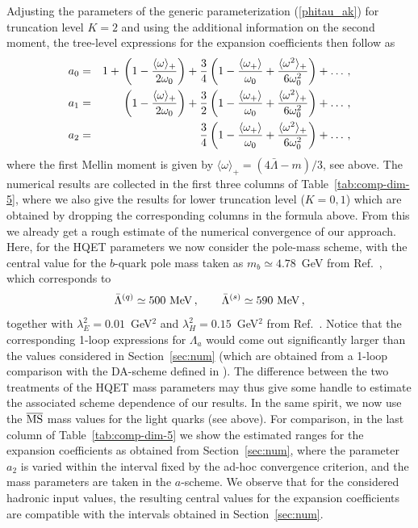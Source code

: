 \documentclass[a4paper,11pt]{article}
\begin{document}
Adjusting the parameters of the generic parameterization (\ref{phitau_ak}) for truncation level $K=2$ and using the additional information on the second moment, 
the tree-level expressions for the expansion coefficients then follow as
\begin{eqnarray}
	a_0 &=&  1  + {}\left(1- \frac{\langle \omega \rangle_+}{2\omega_0}\right) 
     + {} \frac34 \left( 1 -\frac{\langle \omega_+\rangle}{\omega_0}
     + \frac{\langle \omega^2\rangle_+}{6\omega_0^2} \right) + \ldots  \,, \cr 
	a_1 &=&  \phantom{1  + {}}  \left(1- \frac{\langle \omega\rangle_+}{2\omega_0}\right) + \frac32 \left( 1 -\frac{\langle \omega_+\rangle}{\omega_0}
     + {} \frac{\langle \omega^2\rangle_+}{6\omega_0^2} \right) + \ldots \,, \cr 
    a_2 &=& \phantom{1  + {}\left(1- \frac{\langle \omega\rangle_+}{2\omega_0}\right) + {}} 
     {} \frac34 \left( 1 -\frac{\langle \omega_+\rangle}{\omega_0}
     + {} \frac{\langle \omega^2\rangle_+}{6\omega_0^2} \right) + \ldots \,,
\end{eqnarray}
where the first Mellin moment is given by $\langle \omega\rangle_+= (4\bar\Lambda- m)/3$, see above.
The numerical results are collected in the first three columns of Table~\ref{tab:comp-dim-5}, where we also give the results for lower truncation level ($K=0,1$) 
which are obtained by dropping the corresponding columns in the formula above. From this we already get a rough estimate of the numerical convergence of our approach.
%
Here, for the HQET parameters we now consider the pole-mass scheme, with the central value for the 
$b$-quark pole mass taken as $m_b \simeq 4.78$~GeV from Ref.~\cite{ParticleDataGroup:2022pth}, which corresponds to
$$
\bar\Lambda^{(q)}  \simeq 500~{\rm MeV} \,, 
\qquad 
\bar\Lambda^{(s)}  \simeq 590~{\rm MeV} \,,
$$
together with $\lambda_E^2=0.01$~GeV$^2$ and $\lambda_H^2=0.15$~GeV$^2$ from Ref.~\cite{Rahimi:2020zzo}.
%
Notice that the corresponding 1-loop expressions for $\Lambda_a$ would come out significantly larger than the values considered in 
Section~\ref{sec:num} (which are obtained from a 1-loop comparison with the DA-scheme defined in \cite{Lee:2005gza}). 
The difference between the two treatments of the HQET mass parameters may thus give some handle to estimate 
the associated scheme dependence of our results.
%
In the same spirit, we now use the $\overline{\rm MS}$ mass values for the light quarks (see above).
%
For comparison, in the last column of Table~\ref{tab:comp-dim-5} we show the estimated ranges for the expansion coefficients as obtained from Section~\ref{sec:num}, where the parameter $a_2$
is varied within the interval fixed by the ad-hoc convergence criterion, and the mass parameters are taken in the $a$-scheme. We observe that for the considered hadronic input values, the resulting central values for the expansion coefficients are compatible with the intervals obtained in Section~\ref{sec:num}.
\end{document}
